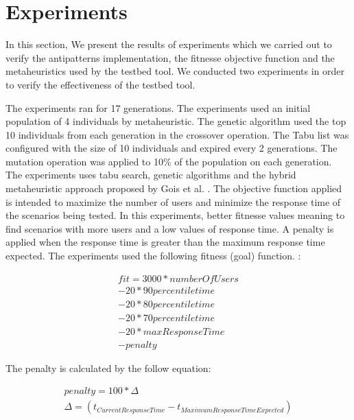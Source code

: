 \documentclass[times]{stvrauth}
\begin{document}
\FloatBarrier
\section{Experiments}

In this section, We present the results of experiments which we carried out to verify the antipatterns  implementation, the fitnesse objective function and the metaheuristics used by the testbed tool. We conducted two experiments in order to verify the effectiveness of the testbed tool.

The experiments ran for 17 generations. The experiments used an initial population of 4 individuals by metaheuristic. The genetic algorithm used the top 10 individuals from each generation in the crossover operation. The Tabu list was configured with the size of 10 individuals and expired every 2 generations.  The mutation operation was applied to 10\% of the population on each generation. The experiments uses tabu search, genetic algorithms and the hybrid metaheuristic approach proposed by Gois et al. \cite{Gois2016}. The objective function applied is intended to maximize the number of users and minimize the response time of the scenarios being tested.  In this experiments, better fitnesse values meaning to find scenarios with more users and a low values of response time. A penalty is applied when the response time is greater than the  maximum response time expected. The experiments used the following fitness (goal) function. :

\begin{equation}
\begin{aligned}
fit=3000*numberOfUsers\\
-20* 90percentiletime\\
-20*80percentiletime\\
-20*70percentiletime\\
-20*maxResponseTime\\
-penalty
\end{aligned}
\end{equation}

The penalty is calculated by the follow equation:

\begin{equation}
\begin{aligned}
penalty=100 * \Delta \\
\Delta=(t_{Current Response Time} - t_{Maximum Response Time Expected})\\
\end{aligned}
\end{equation}
\end{document}
